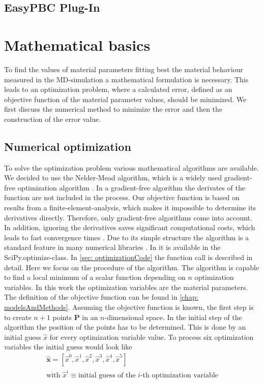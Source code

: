 \subsection{EasyPBC Plug-In} \label{subsec: EasPBC}



\section{Mathematical basics} \label{sec: mathematics}

To find the values of material parameters fitting best the material behaviour measured in the MD-simulation a mathematical formulation is necessary. This leads to an optimization problem, where a calculated error, defined as an objective function of the material parameter values, should be minimized. We first discuss the numerical method to minimize the error and then the construction of the error value.

\subsection{Numerical optimization} \label{subsec: numericalOptimization}
To solve the optimization problem various mathematical algorithms are available. We decided to use the Nelder-Mead algorithm, which is a widely used gradient-free optimization algorithm \cite{gao_implementing_2012}. In a gradient-free algorithm the derivates of the function are not included in the process. Our objective function is based on results from a finite-element-analysis, which makes it impossible to determine its derivatives directly. Therefore, only gradient-free algorithms come into account. In addition, ignoring the derivatives saves significant computational costs, which leads to fast convergence times \cite{pham_comparative_2011}. Due to its simple structure the algorithm is a standard feature in many numerical libraries \cite{singer_efficient_2004}. In  it is available in the SciPy.optimize-class. In \autoref{sec: optimizationCode} the function call is described in detail. Here we focus on the procedure of the algorithm. The algorithm is capable to find a local minimum of a scalar function depending on $n$ optimization variables. In this work the optimization variables are the material parameters. The definition of the objective function can be found in \autoref{chap: modelsAndMethods}. Assuming the objective function is known, the first step is to create $n+1$ points $\mathbf{P}$ in an $n$-dimensional space. In the initial step of the algorithm the position of the points has to be determined. This is done by an initial guess $\hat{x}$ for every optimization variable value. To process six optimization variables the initial guess would look like
\begin{gather*}
    \mathbf{\hat{x}} = [\hat{x}^0, \hat{x}^1, \hat{x}^2, \hat{x}^3, \hat{x}^4, \hat{x}^5] \\
    \text{with } \hat{x}^i \equiv \text{initial guess of the $i$-th optimization variable}
\end{gather*}

